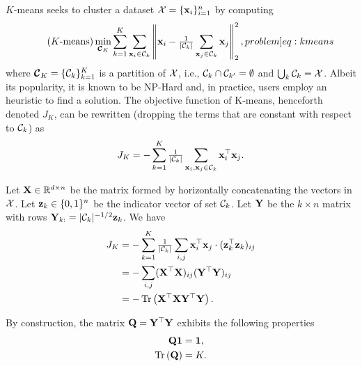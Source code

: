 \documentclass[twoside,11pt]{article}
\begin{document}
$K$-means seeks to cluster a dataset ${\mathcal{X}} = \{ {\mathbf{x}}_i \}_{i=1}^{n}$ by computing
\begin{equation}
\tag{$K$-means}
%
\min_{\bm{\set{C}}_K}
\sum_{k=1}^{K} \sum_{\vect{x}_i \in \set{C}_k}
\norm{\vect{x}_i - \tfrac{1}{|\set{C}_k|} \sum_{\vect{x}_j \in \set{C}_k} \vect{x}_j }{2}^2 ,
%
\label[problem]{eq:kmeans}
\end{equation}
where $\bm{{\mathcal{C}}}_K = \{ {\mathcal{C}}_k\}_{k=1}^{K}$ is a partition of ${\mathcal{X}}$, i.e., ${\mathcal{C}}_{k} \cap {\mathcal{C}}_{k'} = \emptyset$ and  $\bigcup_k {\mathcal{C}}_k = {\mathcal{X}}$.
Albeit its popularity, it is known to be NP-Hard and, in practice, users employ an heuristic \citep[][originally developed in 1957]{Lloyd1982} to find a solution.
The objective function of K-means, henceforth denoted $J_K$, can be rewritten (dropping the  terms that are constant with respect to ${\mathcal{C}}_k$) as
\begin{equation}
J_K = 
- \sum_{k=1}^{K}
\tfrac{1}{|{\mathcal{C}}_k|} \sum_{{\mathbf{x}}_i, {\mathbf{x}}_j \in {\mathcal{C}}_k} {{\mathbf{x}}}^\top_i {\mathbf{x}}_j .
\end{equation}

Let ${\mathbf{X}} \in {\mathbb R}^{d \times n}$ be the matrix formed by horizontally concatenating the vectors in ${\mathcal{X}}$.
Let ${\mathbf{z}}_k \in \{ 0, 1 \}^{n}$ be the indicator vector of set ${\mathcal{C}}_k$.
Let ${\mathbf{Y}}$ be the $k \times n$ matrix with rows ${\mathbf{Y}}_{k:} = |{\mathcal{C}}_k|^{-1/2} {\mathbf{z}}_k$. We have
\begin{subequations}
	\begin{align}
		J_K 
		&= - \sum_{k=1}^{K} \tfrac{1}{|{\mathcal{C}}_k|} \sum_{i, j} {{\mathbf{x}}}^\top_i {\mathbf{x}}_j \cdot ({{\mathbf{z}}}^\top_k {\mathbf{z}}_k)_{ij} \\
		&= - \sum_{i, j} ({{\mathbf{X}}}^\top {\mathbf{X}})_{ij} ({{\mathbf{Y}}}^\top {\mathbf{Y}})_{ij} \\
		&= - \operatorname{Tr}\left({{\mathbf{X}}}^\top {\mathbf{X}} {{\mathbf{Y}}}^\top {\mathbf{Y}}\right) .
		\label{eq:trace_xtxyty}
	\end{align}
\end{subequations}

By construction, the matrix ${\mathbf{Q}} = {{\mathbf{Y}}}^\top {\mathbf{Y}}$ exhibits the following properties
\begin{align}
	{\mathbf{Q}} {\mathbf{1}} &= {\mathbf{1}} , \\
	\operatorname{Tr}\left({\mathbf{Q}}\right) &= K .
\end{align}
\end{document}
